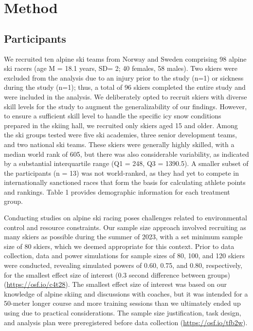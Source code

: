 \documentclass[pdflatex,sn-mathphys-num]{sn-jnl}%
\theoremstyle{thmstyleone}%
\theoremstyle{thmstyletwo}%
\theoremstyle{thmstylethree}%
\begin{document}
\section{Method}


\subsection{Participants}
We recruited ten alpine ski teams from Norway and Sweden comprising 98 alpine ski racers (age M = 18.1 years, SD= 2; 40 females, 58 males). Two skiers were excluded from the analysis due to an injury prior to the study (n=1) or sickness during the study (n=1); thus, a total of 96 skiers completed the entire study and were included in the analysis. We deliberately opted to recruit skiers with diverse skill levels for the study to augment the generalizability of our findings. However, to ensure a sufficient skill level to handle the specific icy snow conditions prepared in the skiing hall, we recruited only skiers aged 15 and older. Among the ski groups tested were five ski academies, three senior development teams, and two national ski teams. These skiers were generally highly skilled, with a median world rank of 605, but there was also considerable variability, as indicated by a substantial interquartile range (Q1 = 248, Q3 = 1390.5). A smaller subset of the participants (n = 13) was not world-ranked, as they had yet to compete in internationally sanctioned races that form the basis for calculating athlete points and rankings. Table 1 provides demographic information for each treatment group.

Conducting studies on alpine ski racing poses challenges related to environmental control and resource constraints. Our sample size approach involved recruiting as many skiers as possible during the summer of 2023, with a set minimum sample size of 80 skiers, which we deemed appropriate for this context. Prior to data collection, data and power simulations for sample sizes of 80, 100, and 120 skiers were conducted, revealing simulated powers of 0.60, 0.75, and 0.80, respectively, for the smallest effect size of interest (0.3 second difference between groups) (\url{https://osf.io/c4t28}). The smallest effect size of interest was based on our knowledge of alpine skiing and discussions with coaches, but it was intended for a 50-meter longer course and more training sessions than we ultimately ended up using due to practical considerations. The sample size justification, task design, and analysis plan were preregistered before data collection (\url{https://osf.io/tfb2w}).
\end{document}
